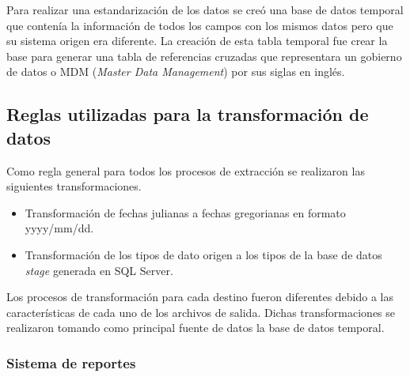 Para realizar una estandarización de los datos se creó una base de datos
temporal que contenía la información de todos los campos con los mismos datos
pero que su sistema origen era diferente. La creación de esta tabla temporal fue
crear la base para generar una tabla de referencias cruzadas que representara un
gobierno de datos o MDM (\emph{Master Data Management}) por sus siglas en
inglés.

\subsection{Reglas utilizadas para la transformación de datos}

Como regla general para todos los procesos de extracción se realizaron las
siguientes transformaciones.

\begin{itemize}
\item Transformación de fechas julianas a fechas gregorianas en formato
  \linebreak \mbox{yyyy/mm/dd}.
\item Transformación de los tipos de dato origen a los tipos de la base de
  datos \emph{stage} generada en SQL Server.
\end{itemize}

Los procesos de transformación para cada destino fueron diferentes debido a las
características de cada uno de los archivos de salida. Dichas transformaciones
se realizaron tomando como principal fuente de datos la base de datos temporal.

\subsubsection{Sistema de reportes}

